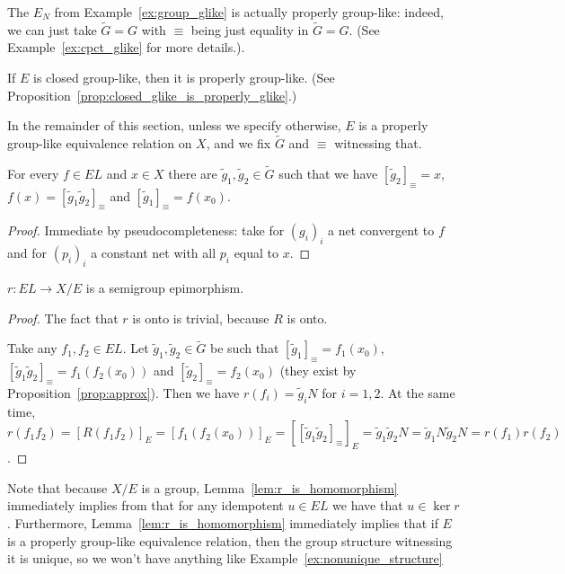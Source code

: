 	\begin{ex}
		The $E_N$ from Example~\ref{ex:group_glike} is actually properly group-like: indeed, we can just take $\tilde G=G$ with ${\equiv}$ being just equality in $\tilde G=G$. (See Example~\ref{ex:cpct_glike} for more details.).\xqed{\lozenge}
	\end{ex}
	
	\begin{ex}
		\label{ex:closed_glike_is_properly_glike}
		If $E$ is closed group-like, then it is properly group-like. (See Proposition~\ref{prop:closed_glike_is_properly_glike}.)\xqed{\lozenge}
	\end{ex}
	
	In the remainder of this section, unless we specify otherwise, $E$ is a properly group-like equivalence relation on $X$, and we fix $\tilde G$ and $\equiv$ witnessing that.
	
	\begin{prop}
		\label{prop:approx}
		For every $f\in EL$ and $x\in X$ there are $\tilde g_1,\tilde g_2\in \tilde G$ such that we have $[\tilde g_2]_\equiv=x$, $f(x)=[\tilde g_1\tilde g_2]_\equiv$ and $[\tilde g_1]_\equiv=f(x_0)$.
	\end{prop}
	\begin{proof}
		Immediate by pseudocompleteness: take for $(g_i)_i$ a net convergent to $f$ and for $(p_i)_i$ a constant net with all $p_i$ equal to $x$.
	\end{proof}
	
	
	
	
	\begin{lem}
		\label{lem:r_is_homomorphism}
		$r\colon EL\to X/E$ is a semigroup epimorphism.
	\end{lem}
	\begin{proof}
		The fact that $r$ is onto is trivial, because $R$ is onto.
		
		Take any $f_1,f_2\in EL$. Let $\tilde g_1,\tilde g_2\in \tilde G$ be such that $[\tilde g_1]_\equiv=f_1(x_0)$, $[\tilde g_1\tilde g_2]_{\equiv}=f_1(f_2(x_0))$ and $[\tilde g_2]_\equiv=f_2(x_0)$ (they exist by Proposition~\ref{prop:approx}). Then we have $r(f_i)=\tilde g_iN$ for $i=1,2$. At the same time, $r(f_1f_2)=[R(f_1f_2)]_E=[f_1(f_2(x_0))]_E=[[\tilde g_1\tilde g_2]_\equiv]_E=\tilde g_1\tilde g_2N=\tilde g_1N\tilde g_2N=r(f_1)r(f_2)$.
	\end{proof}
	Note that because $X/E$ is a group, Lemma~\ref{lem:r_is_homomorphism} immediately implies from that for any idempotent $u\in EL$ we have that $u\in \ker r$. Furthermore, Lemma~\ref{lem:r_is_homomorphism} immediately implies that if $E$ is a properly group-like equivalence relation, then the group structure witnessing it is unique, so we won't have anything like Example~\ref{ex:nonunique_structure}
	
